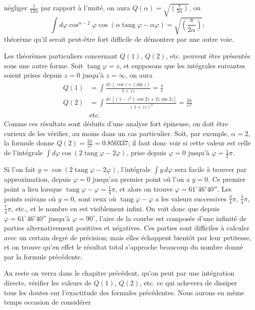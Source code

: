 \documentclass{article}
\begin{document}
négliger $\frac{1}{12\alpha}$ par rapport à l'unité, on aura $Q(\alpha)=\sqrt{\left(\frac{\pi}{2\alpha}\right)}$, ou
\[ \int d\varphi\cos^{\alpha-2}\varphi\cos(\alpha\operatorname{tang}\varphi-\alpha\varphi)=\sqrt{\left(\frac{\pi}{2\alpha}\right)}; \]
théorème qu'il serait peut-être fort difficile de démontrer par une autre voie.

Les théorèmes particuliers concernant $Q(1)$, $Q(2)$, etc. peuvent être présentés sous une autre forme. Soit $\operatorname{tang}\varphi=z$, et supposons que les intégrales suivantes soient prises depuis $z=0$ jusqu'à $z=\infty$, on aura
\[ \begin{aligned} Q(1)&=\int\frac{dz\,(\cos z+z\sin z)}{1+zz}=\frac{\pi}{e}\\ Q(2)&=\int\frac{dz\,[(1-z^{2})\cos 2z+2z\sin 2z]}{(1+zz)^{2}}=\frac{2\pi}{e^{2}}\\ &\text{etc.} \end{aligned} \tag{4} \]
Comme ces résultats sont déduits d'une analyse fort épineuse, on doit être curieux de les vérifier, au moins dans un cas particulier. Soit, par exemple, $\alpha=2$, la formule donne $Q(2)=\frac{2\pi}{e^{2}}=0.850337$; il faut donc voir si cette valeur est celle de l'intégrale $\displaystyle\int d\varphi\cos(2\operatorname{tang}\varphi-2\varphi)$, prise depuis $\varphi=0$ jusqu'à $\varphi=\frac{1}{2}\pi$.

Si l'on fait $y=\cos(2\operatorname{tang}\varphi-2\varphi)$, l'intégrale $\displaystyle\int y\,d\varphi$ sera facile à trouver par approximation, depuis $\varphi=0$ jusqu'au premier point où l'on a $y=0$. Ce premier point a lieu lorsque $\operatorname{tang}\varphi-\varphi=\frac{1}{4}\pi$, et alors on trouve $\varphi=61^{\circ}46'40''$. Les points suivans où $y=0$, sont ceux où $\operatorname{tang}\varphi-\varphi$ a les valeurs successives $\frac{3}{4}\pi$, $\frac{5}{4}\pi$, $\frac{7}{4}\pi$, etc., et le nombre en est visiblement infini. On voit donc que depuis $\varphi=61^{\circ}46'40''$ jusqu'à $\varphi=90^{\circ}$, l'aire de la courbe est composée d'une infinité de parties alternativement positives et négatives. Ces parties sont difficiles à calculer avec un certain degré de précision; mais elles échappent bientôt par leur petitesse, et on trouve qu'en effet le résultat total s'approche beaucoup du nombre donné par la formule précédente.

Au reste on verra dans le chapitre précédent, qu'on peut par une intégration directe, vérifier les valeurs de $Q(1)$, $Q(2)$, etc. ce qui achevera de dissiper tous les doutes sur l'exactitude des formules précédentes. Nous aurons en même temps occasion de considérer
\end{document}
